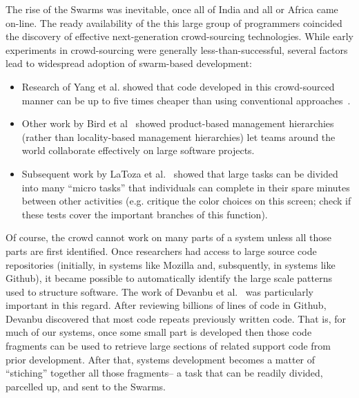 \documentclass[journal]{IEEEtran}
\newcommand{\bi}{\begin{itemize}}
\newcommand{\ei}{\end{itemize}}
\begin{document}
The rise of the Swarms was inevitable, once all of
India and all or Africa came on-line.  The ready
availability of the this large group of programmers
coincided the discovery of effective next-generation
crowd-sourcing technologies.  While early
experiments in crowd-sourcing were generally
less-than-successful, several factors lead to
widespread adoption of swarm-based development:
\bi
\item
Research of Yang et al. showed that code developed
in this crowd-sourced manner can be up to five times
cheaper than using conventional approaches~\cite{mao13}.
\item
Other work by Bird et al~\cite{kocharm13} showed
product-based management hierarchies (rather than
locality-based management hierarchies) let teams
around the world collaborate effectively on large
software projects.
\item
  Subsequent work by LaToza et
al.~\cite{Latoza2013} showed that large tasks can be divided
into many ``micro tasks'' that individuals can
complete in their spare minutes between other
activities (e.g. critique the color choices on this
screen; check if these tests cover the important
branches of this function).
\ei
Of course, the crowd cannot work on many parts of a
system unless all those parts are first
identified. Once researchers had access to large
source code repositories (initially, in systems like
Mozilla and, subsquently, in systems like Github),
it became possible to automatically identify the
large scale patterns used to structure software. The
work of Devanbu et al.~\cite{Hindle2012} was particularly
important in this regard.  After reviewing billions
of lines of code in Github, Devanbu discovered that
most code repeats previously written code. That is,
for much of our systems, once some small part is
developed then those code fragments can be used to
retrieve large sections of related support code from
prior development. After that, systems development
becomes a matter of ``stiching'' together all those
fragments-- a task that can be readily divided,
parcelled up, and sent to the Swarms.
\end{document}
